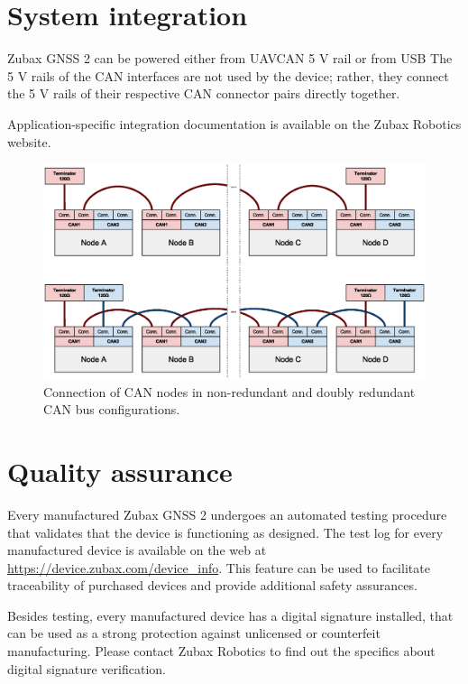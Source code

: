 \documentclass{zubaxdoc}
\begin{document}
\section{System integration}

Zubax GNSS 2 can be powered either from UAVCAN 5 V rail or from USB
The 5 V rails of the CAN interfaces are not used by the device; rather,
they connect the 5 V rails of their respective CAN connector pairs directly together.

Application-specific integration documentation is available on the Zubax Robotics website.

\begin{figure}[hb]
    \centering
	\includegraphics[width=\textwidth]{can_daisy_chain}
	\caption{Connection of CAN nodes in non-redundant and doubly redundant CAN bus configurations.
	\label{can_daisy_chain_non_redundant}}
\end{figure}

\section{Quality assurance}

Every manufactured Zubax GNSS 2 undergoes an automated testing procedure that validates that
the device is functioning as designed.
The test log for every manufactured device is available on the web at
\url{https://device.zubax.com/device_info}.
This feature can be used to facilitate traceability of purchased devices and
provide additional safety assurances.

Besides testing, every manufactured device has a digital signature installed,
that can be used as a strong protection against unlicensed or counterfeit manufacturing.
Please contact Zubax Robotics
to find out the specifics about digital signature verification.
\end{document}
